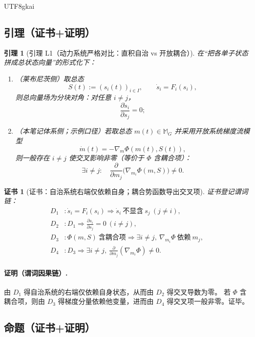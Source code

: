 \documentclass[12pt]{article}
\newtheorem{lemma}{引理}[section]
\newtheorem{Certificate}{证书}[section]
\begin{document}
\begin{CJK*}{UTF8}{gkai}
\subsection{引理（证书+证明）}
\label{subsec:tex29-causal-category-contrast-lemmas}

\begin{lemma}[引理 L1（动力系统严格对比：直积自治 vs 开放耦合）]
\label{lem:tex29-dynamics-product-vs-coupled}
在“把各单子状态拼成总状态向量”的形式化下：
\begin{enumerate}
  \item （莱布尼茨侧）取总态
  \[
    S(t):=(s_i(t))_{i\in I},
    \qquad
    \dot{s}_i=F_i(s_i),
  \]
  则总向量场为分块对角：对任意 $i\neq j$，
  \[
    \frac{\partial \dot{s}_i}{\partial s_j}=0;
  \]
  \item （本笔记体系侧；示例口径）若取总态 $m(t)\in\mathbb{M}_G$ 并采用开放系统梯度流模型
  \[
    \dot{m}(t)=-\nabla_m\Phi(m(t),S(t)),
  \]
  则一般存在 $i\neq j$ 使交叉影响非零（等价于 $\Phi$ 含耦合项）：
  \[
    \exists i\neq j:\quad
    \frac{\partial}{\partial m_j}\bigl(\nabla_{m_i}\Phi(m,S)\bigr)\neq 0.
  \]
\end{enumerate}
\end{lemma}

\begin{Certificate}[证书：自治系统右端仅依赖自身；耦合势函数导出交叉项]
\label{cert:tex29-dynamics-product-vs-coupled}
证书登记谓词链：
\[
\begin{aligned}
  D_1 &: \dot{s}_i=F_i(s_i)\Rightarrow \dot{s}_i\ \text{不显含}\ s_j\ (j\neq i),\\
  D_2 &: D_1\Rightarrow \frac{\partial \dot{s}_i}{\partial s_j}=0\ (i\neq j),\\
  D_3 &: \Phi(m,S)\ \text{含耦合项}\Rightarrow \exists i\neq j,\ \nabla_{m_i}\Phi\ \text{依赖}\ m_j,\\
  D_4 &: D_3\Rightarrow \exists i\neq j,\ \frac{\partial}{\partial m_j}(\nabla_{m_i}\Phi)\neq 0.
\end{aligned}
\]
\end{Certificate}

\paragraph{证明（谓词因果链）.}
由 $D_1$ 得自治系统的右端仅依赖自身状态，从而由 $D_2$ 得交叉导数为零。
若 $\Phi$ 含耦合项，则由 $D_3$ 得梯度分量依赖他变量，进而由 $D_4$ 得交叉项一般非零。证毕。

\subsection{命题（证书+证明）}
\label{subsec:tex29-causal-category-contrast-props}


\end{CJK*}
\end{document}
